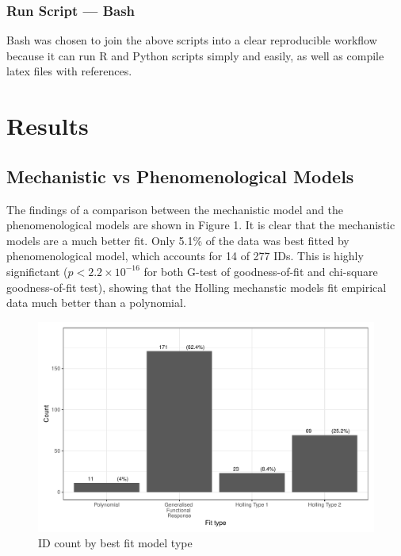 \documentclass[11pt, a4paper, titlepage]{article}
\begin{document}
\subsubsection{Run Script — Bash}

Bash was chosen to join the above scripts into a clear reproducible workflow because it can run R and Python scripts simply and easily, as well as compile latex files with references.




\section{Results}

\subsection{Mechanistic vs Phenomenological Models}

The findings of a comparison between the mechanistic model and the phenomenological models are shown in Figure 1. It is clear that the mechanistic models are a much better fit. Only 5.1\% of the data was best fitted by phenomenological model, which accounts for 14 of 277 IDs. This is highly significtant ($p < 2.2\times10^{-16}$ for both G-test of goodness-of-fit and chi-square goodness-of-fit test), showing that the Holling mechanstic models fit empirical data much better than a polynomial.

\begin{figure}[ht!]
	\centering\includegraphics[width=1\textwidth]{../Results/Model_Comparison_Barchart.pdf}
	\caption{ID count by best fit model type}
\end{figure}
\end{document}
